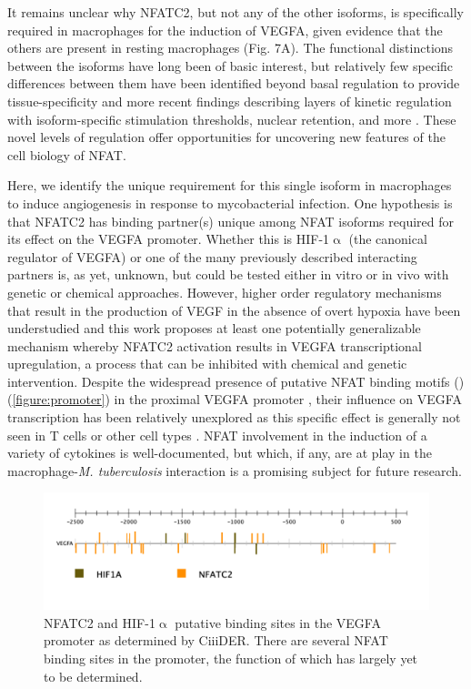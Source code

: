 It remains unclear why NFATC2, but not any of the other isoforms, is specifically required in macrophages for the induction of VEGFA, given evidence that the others are present in resting macrophages (Fig. 7A). The functional distinctions between the isoforms have long been of basic interest, but relatively few specific differences between them have been identified beyond basal regulation to provide tissue-specificity and more recent findings describing layers of kinetic regulation with isoform-specific stimulation thresholds, nuclear retention, and more \citep{Lyakh1997, Rao1997, Kar2014, Kar2015, Kar2016, Yissachar2013}. These novel levels of regulation offer opportunities for uncovering new features of the cell biology of NFAT.

Here, we identify the unique requirement for this single isoform in macrophages to induce angiogenesis in response to mycobacterial infection. One hypothesis is that NFATC2 has binding partner(s) unique among NFAT isoforms required for its effect on the VEGFA promoter. Whether this is HIF-1$\upalpha$ (the canonical regulator of VEGFA) or one of the many previously described interacting partners is, as yet, unknown, but could be tested either in vitro or in vivo with genetic or chemical approaches. However, higher order regulatory mechanisms that result in the production of VEGF in the absence of overt hypoxia have been understudied and this work proposes at least one potentially generalizable mechanism whereby NFATC2 activation results in VEGFA transcriptional upregulation, a process that can be inhibited with chemical and genetic intervention. Despite the widespread presence of putative NFAT binding motifs () (\autoref{figure:promoter}) in the proximal VEGFA promoter \citep{Gearing2019}, their influence on VEGFA transcription has been relatively unexplored as this specific effect is generally not seen in T cells or other cell types \citep{Chang2004}. NFAT involvement in the induction of a variety of cytokines is well-documented, but which, if any, are at play in the macrophage-\textit{M. tuberculosis} interaction is a promising subject for future research. 

\begin{figure}
\centering
\includegraphics[width=\textwidth]{images/vegfapromoter.pdf}
\caption{NFATC2 and HIF-1$\upalpha$ putative binding sites in the VEGFA promoter as determined by CiiiDER. There are several NFAT binding sites in the promoter, the function of which has largely yet to be determined.}
\label{figure:promoter}
\end{figure}

